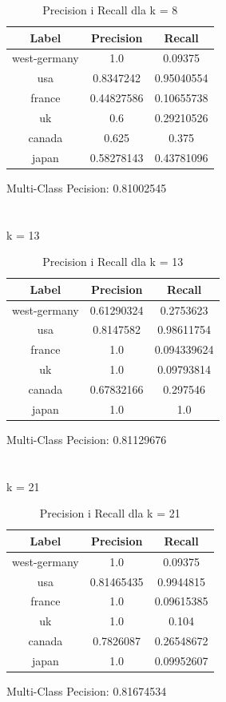 \documentclass{classrep}
\begin{document}
\begin{table}[H]
\begin{tabular}{|c|c|c|}
\hline
Label        & Precision  & Recall     \\ \hline
west-germany & 1.0        & 0.09375    \\ \hline
usa          & 0.8347242  & 0.95040554 \\ \hline
france       & 0.44827586 & 0.10655738 \\ \hline
uk           & 0.6        & 0.29210526 \\ \hline
canada       & 0.625      & 0.375      \\ \hline
japan        & 0.58278143 & 0.43781096 \\ \hline
\end{tabular}
\caption{Precision i Recall dla k = 8}
\end{table}
Multi-Class Pecision: 0.81002545\\
\\
\\
k = 13
\begin{table}[H]
\begin{tabular}{|c|c|c|}
\hline
Label        & Precision  & Recall      \\ \hline
west-germany & 0.61290324 & 0.2753623   \\ \hline
usa          & 0.8147582  & 0.98611754  \\ \hline
france       & 1.0        & 0.094339624 \\ \hline
uk           & 1.0        & 0.09793814  \\ \hline
canada       & 0.67832166 & 0.297546    \\ \hline
japan        & 1.0        & 1.0         \\ \hline
\end{tabular}
\caption{Precision i Recall dla k = 13}
\end{table}
Multi-Class Pecision: 0.81129676\\
\\
\\
k = 21
\begin{table}[H]
\begin{tabular}{|c|c|c|}
\hline
Label        & Precision  & Recall     \\ \hline
west-germany & 1.0        & 0.09375    \\ \hline
usa          & 0.81465435 & 0.9944815  \\ \hline
france       & 1.0        & 0.09615385 \\ \hline
uk           & 1.0        & 0.104      \\ \hline
canada       & 0.7826087  & 0.26548672 \\ \hline
japan        & 1.0        & 0.09952607 \\ \hline
\end{tabular}
\caption{Precision i Recall dla k = 21}
\end{table}
Multi-Class Pecision: 0.81674534
\newpage
\end{document}
